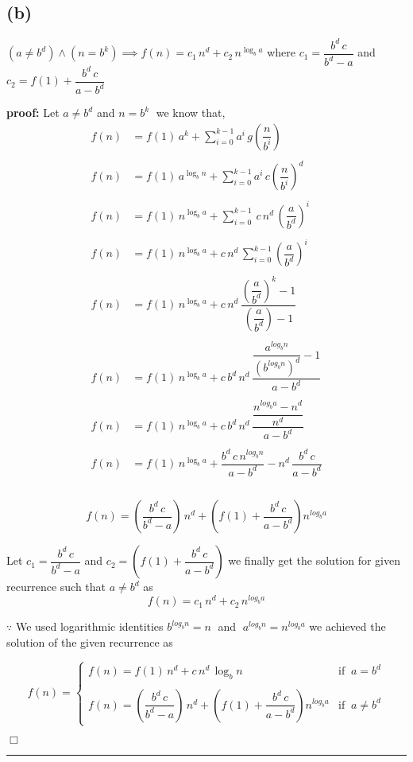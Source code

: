 \documentclass{article}
\newcommand{\qed}{\hfill \ensuremath{\Box}}
\begin{document}
\newpage
\subsection*{(b)}
$(a \neq b^d) \land (n=b^k) \implies f(n)=c_1\,n^d + c_2\,n^{\log_b a}$
where $c_1=\dfrac{b^d\,c}{b^d - a}$ and $c_2=f(1)+\dfrac{b^d\,c}{a - b^d}$
\null\par\null
\noindent \textbf{proof:} Let $a \neq b^d$ and $n=b^k\;$ we know that,
\begin{align*}
f(n)&=f(1)\,a^k+\displaystyle\sum_{i=0}^{k-1}a^i\,g\left(\dfrac{n}{b^i}\right) \\ \\
f(n)&=f(1)\,a^{\log_b n}+\displaystyle\sum_{i=0}^{k-1}a^i\,
c\left(\dfrac{n}{b^i}\right)^{d}\\ \\
f(n)&=f(1)\,n^{\log_b a}+\displaystyle\sum_{i=0}^{k-1}\,c\,n^d\,\left(\dfrac{a}{b^d}\right)^{i}\\ \\
f(n)&=f(1)\,n^{\log_b a}+c\,n^d\,\displaystyle\sum_{i=0}^{k-1}\left(\dfrac{a}{b^d}\right)^{i}\\ \\
f(n)&=f(1)\,n^{\log_b a}+c\,n^d\,\dfrac{\left(\dfrac{a}{b^d}\right)^{k}-1}
{\left(\dfrac{a}{b^d}\right)-1}\\ \\
f(n)&=f(1)\,n^{\log_b a}+c\,b^d\,n^d\,\dfrac{\dfrac{a^{log_b n}}{(b^{log_b n})^d}-1}{a-b^d} \\ \\
f(n)&=f(1)\,n^{\log_b a}+c\,b^d\,n^d\,\dfrac{\dfrac{n^{log_b a}-n^d}{n^d}}{a-b^d} \\ \\
f(n)&=f(1)\,n^{\log_b a}+\dfrac{b^d\,c\,n^{log_b n}}{a-b^d}-n^d\,\dfrac{b^d\,c}{a-b^d} \\ \\
\end{align*}

\newpage

\[f(n)=\left(\dfrac{b^d\,c}{b^d-a}\right)\,n^d +\left(f(1)+\dfrac{b^d\,c}{a-b^d}\right)n^{log_b a}\]
\null \par \null
\noindent Let $c_1=\dfrac{b^d\,c}{b^d-a}$ and $c_2=\left(f(1)+\dfrac{b^d\,c}{a-b^d}\right)$ we
finally get the solution for given recurrence such that $a \neq b^d$ as 
$$f(n)=c_1\,n^d +c_2\,n^{log_b a}$$
\null \par \null
\noindent $\because$ We used logarithmic identities $b^{log_b n} = n\;$ and $\;a^{log_b n} = n^{log_b a}$
we achieved the solution of the given recurrence as 
\null \par
\[ f(n) =
\begin{cases} 
f(n)=f(1)\,n^{d}+c\,n^d\,\log_b n &\text{if}\;\;a = b^d  \\ \\
f(n)=\left(\dfrac{b^d\,c}{b^d-a}\right)\,n^d +\left(f(1)+\dfrac{b^d\,c}{a-b^d}\right)n^{log_b a}     &\text{if}\;\; a \neq b^d 
   \end{cases}
\]
\null \par \null
\qed
\null \par \null
\hrule
\end{document}
